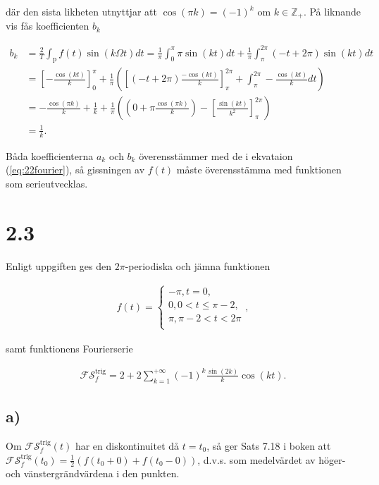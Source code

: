 \documentclass[a4paper]{article}
\begin{document}
\noindent där den sista likheten utnyttjar att $\cos(\pi k) = (-1)^k$ om $k \in
\mathbb{Z}_+$. På liknande vis fås koefficienten $b_k$

\begin{align*}
  b_k &= \frac{2}{T}\int_{\text{p}}f(t)\sin(k\Omega t)dt = \frac{1}{\pi}\int_0^{\pi}\pi\sin(kt)dt + \frac{1}{\pi}\int_{\pi}^{2\pi}(-t + 2\pi)\sin(kt)dt\\
      &= \left[ -\frac{\cos(kt)}{k} \right]_0^{\pi} + \frac{1}{\pi}\left( \left[ (-t+2\pi)\frac{-\cos(kt)}{k} \right]_{\pi}^{2\pi} + \int_{\pi}^{2\pi}-\frac{\cos(kt)}{k}dt \right)\\
      &= -\frac{\cos(\pi k)}{k} + \frac{1}{k} + \frac{1}{\pi}\left( \left( 0 + \pi\frac{\cos(\pi k)}{k} \right) - \left[ \frac{\sin(kt)}{k^2} \right]_{\pi}^{2\pi} \right)\\
  &= \frac{1}{k}.
\end{align*}

Båda koefficienterna $a_k$ och $b_k$ överensstämmer med de i ekvataion
(\ref{eq:22fourier}), så gissningen av $f(t)$ måste överensstämma med funktionen
som serieutvecklas.

\section*{2.3}

Enligt uppgiften ges den $2\pi$-periodiska och jämna funktionen

\begin{align}
  f(t) = 
  \begin{cases}
    -\pi, t = 0,\\
    0, 0 < t \leq \pi - 2,\\
    \pi, \pi - 2 < t < 2\pi\\
  \end{cases},
\end{align}

\noindent samt funktionens Fourierserie

\begin{align}
  \mathcal{FS}_f^{\text{trig}} = 2 + 2\sum_{k=1}^{+\infty}(-1)^k\frac{\sin(2k)}{k}\cos(kt).
\end{align}

\subsection*{a)}

Om $\mathcal{FS}_f^{\text{trig}}(t)$ har en diskontinuitet då $t = t_0$, så ger
Sats 7.18 i boken att $\mathcal{FS}_f^{\text{trig}}(t_0) = \frac{1}{2}\left(
  f(t_0 + 0) + f(t_0 - 0)\right)$, d.v.s. som medelvärdet av höger- och vänstergrändvärdena i den punkten.
\end{document}
